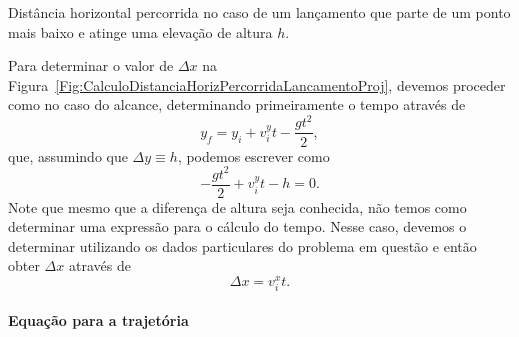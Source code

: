 \begin{marginfigure}[3cm]
\centering
{}
\caption{Distância horizontal percorrida no caso de um lançamento que parte de um ponto mais baixo e atinge uma elevação de altura $h$.\label{Fig:CalculoDistanciaHorizPercorridaLancamentoProj}}
\end{marginfigure}

Para determinar o valor de $\Delta x$ na Figura~\ref{Fig:CalculoDistanciaHorizPercorridaLancamentoProj}, devemos proceder como no caso do alcance, determinando primeiramente o tempo através de
\begin{equation}
	y_f = y_i + v_{i}^{y}t - \frac{gt^2}{2},
\end{equation}
%
que, assumindo que $\Delta y \equiv h$, podemos escrever como
\begin{equation}
	- \frac{gt^2}{2} + v_{i}^{y}t - h = 0.
\end{equation}
%
Note que mesmo que a diferença de altura seja conhecida, não temos como determinar uma expressão para o cálculo do tempo. Nesse caso, devemos o determinar utilizando os dados particulares do problema em questão e então obter $\Delta x$ através de
\begin{equation}
	\Delta x = v_{i}^{x} t.
\end{equation}

\paragraph{Equação para a trajetória}

